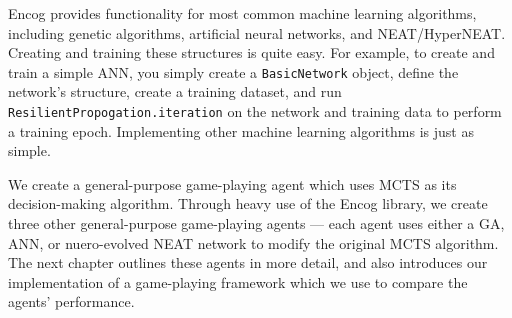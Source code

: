 Encog provides functionality for most common machine learning algorithms, including genetic algorithms, artificial neural networks, and NEAT/HyperNEAT.  Creating and training these structures is quite easy.  For example, to create and train a simple ANN, you simply create a \texttt{BasicNetwork} object, define the network's structure, create a training dataset, and run \texttt{ResilientPropogation.iteration} on the network and training data to perform a training epoch.  Implementing other machine learning algorithms is just as simple.

We create a general-purpose game-playing agent which uses MCTS as its decision-making algorithm.  Through heavy use of the Encog library, we create three other general-purpose game-playing agents  --- each agent uses either a GA, ANN, or nuero-evolved NEAT network to modify the original MCTS algorithm.  The next chapter outlines these agents in more detail, and also introduces our implementation of a game-playing framework which we use to compare the agents' performance.